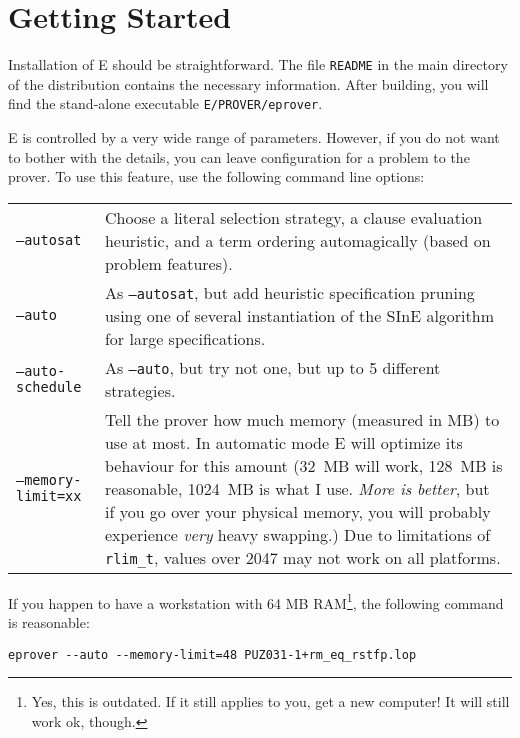 \documentclass{report}
\begin{document}
\chapter{Getting Started}
\label{sec:start}

Installation of E should be straightforward. The file \texttt{README}
in the main directory of the distribution contains the necessary
information. After building, you will find the stand-alone executable
\texttt{E/PROVER/eprover}.

E is controlled by a very wide range of parameters. However, if you do
not want to bother with the details, you can leave configuration for a
problem to the prover. To use this feature, use the following command
line options:

\bigskip
\noindent
\begin{tabular}{lp{7.5cm}}
  \texttt{--autosat}
  & Choose a literal selection strategy, a clause
    evaluation heuristic, and a term ordering automagically\index{xyzzy} (based on
    problem features).\\
  \texttt{--auto}
  & As \texttt{--autosat}, but add heuristic
    specification pruning using one of several instantiation of the SInE
    algorithm~\cite{HV:CADE-2011} for large specifications.\\
  \texttt{--auto-schedule}
  & As \texttt{--auto}, but try not one, but
    up to 5 different strategies. \\
  \texttt{--memory-limit=xx}
  & Tell the prover how much memory
    (measured in MB) to use at most. In automatic mode E will optimize
    its behaviour for this amount (32~MB will work, 128~MB is
    reasonable, 1024~MB is what I use. \emph{More is
    better}\footnotemark, but if you go over
    your physical memory, you will probably experience \emph{very} heavy
    swapping.) Due to limitations of \texttt{rlim\_t}, values over 2047
    may not work on all platforms.\\
\end{tabular}
\begin{example}
  If you happen to have a workstation with 64 MB RAM\footnote{Yes,
    this is outdated. If it still applies to you, get a new
    computer! It will still work ok, though.}, the following command
  is reasonable:
\small
\begin{verbatim}
eprover --auto --memory-limit=48 PUZ031-1+rm_eq_rstfp.lop
\end{verbatim}
  \normalsize
\end{example}
\end{document}
